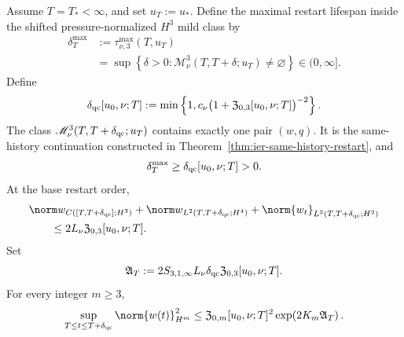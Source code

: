 \begin{theorem}
\label{thm:qc-restart}
Assume \(T=T_*<\infty\), and set \(u_T:=u_*\).
Define the maximal restart lifespan inside the shifted pressure-normalized
\(H^3\) mild class by
\begin{equation}
 \begin{aligned}
 \delta_T^{\max}
 &:=\tau_{\nu,3}^{\max}(T,u_T)\\
 &=\sup\left\{\delta>0:
 \mathscr M_\nu^3(T,T+\delta;u_T)\ne\varnothing\right\}
 \in(0,\infty].
 \end{aligned}
 \label{eq:qc-maximal-restart-lifespan-definition}
\end{equation}
Define
\begin{equation}
 \delta_{\rm qc}[u_0,\nu;T]
 :=\min\left\{
 1,
 c_\nu\bigl(1+\mathfrak Z_{0,3}[u_0,\nu;T]\bigr)^{-2}
 \right\}.
 \label{eq:qc-restart-lifespan}
\end{equation}
The class \(\mathscr M_\nu^3(T,T+\delta_{\rm qc};u_T)\) contains exactly one
pair \((w,q)\).  It is the same-history continuation constructed in
Theorem~\ref{thm:ier-same-history-restart}, and
\begin{equation}
 \delta_T^{\max}\ge\delta_{\rm qc}[u_0,\nu;T]>0.
 \label{eq:qc-restart-lower-bound}
\end{equation}
At the base restart order,
\begin{align}
 &\norm w_{C([T,T+\delta_{\rm qc}];H^3)}
 +\norm w_{L^2(T,T+\delta_{\rm qc};H^4)}
 +\norm{w_t}_{L^2(T,T+\delta_{\rm qc};H^2)}
 \notag\\
 &\qquad\le2L_\nu\mathfrak Z_{0,3}[u_0,\nu;T].
 \label{eq:qc-restart-base-size}
\end{align}
Set
\begin{equation}
 \mathfrak A_T
 :=2S_{3,1,\infty}L_\nu\delta_{\rm qc}
 \mathfrak Z_{0,3}[u_0,\nu;T].
 \label{eq:qc-restart-action}
\end{equation}
For every integer \(m\ge3\),
\begin{equation}
 \sup_{T\le t\le T+\delta_{\rm qc}}\norm{w(t)}_{H^m}^2
 \le\mathfrak Z_{0,m}[u_0,\nu;T]^2
 \exp\!\left(2K_m\mathfrak A_T\right).
 \label{eq:qc-restart-persistence-size}
\end{equation}
\end{theorem}

